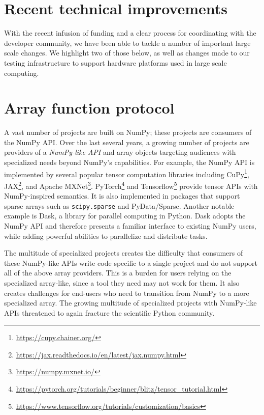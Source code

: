 \section*{Recent technical improvements}

With the recent infusion of funding and a clear process for coordinating with
the developer community, we have been able to tackle a number of important
large scale changes.
We highlight two of those below, as well as changes made to our testing
infrastructure to support hardware platforms used in large scale computing.

\section*{Array function protocol}

A vast number of projects are built on NumPy;
these projects are consumers of the NumPy API.
Over the last several years, a growing number of projects are providers of
a \emph{NumPy-like API} and array objects targeting audiences with specialized
needs beyond NumPy's capabilities.
For example, the NumPy API is implemented by several popular tensor computation
libraries including CuPy\footnote{\url{https://cupy.chainer.org/}},
JAX\footnote{\url{https://jax.readthedocs.io/en/latest/jax.numpy.html}},
and Apache MXNet\footnote{\url{https://numpy.mxnet.io/}}.
PyTorch\footnote{\url{https://pytorch.org/tutorials/beginner/blitz/tensor\_tutorial.html}}
and Tensorflow\footnote{\url{https://www.tensorflow.org/tutorials/customization/basics}}
provide tensor APIs with NumPy-inspired semantics.
It is also implemented in packages that support sparse arrays
such as \texttt{scipy.sparse} and PyData/Sparse.
Another notable example is Dask, a library for parallel computing in
Python.  Dask adopts the NumPy API and therefore presents a familiar
interface to existing NumPy users, while adding powerful abilities to
parallelize and distribute tasks.

The multitude of specialized projects creates the difficulty that consumers
of these NumPy-like APIs write code specific to a single project and do not support
all of the above array providers.
This is a burden for users relying on the specialized array-like, since
a tool they need may not work for them.
It also creates challenges for end-users who need to transition
from NumPy to a more specialized array.
The growing multitude of specialized projects with NumPy-like APIs threatened
to again fracture the scientific Python community.

